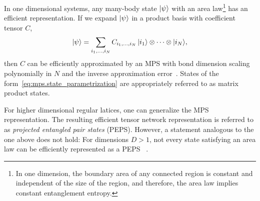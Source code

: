 In one dimensional systems, any many-body state $\ket{\psi}$ with an area law\footnote{%
  In one dimension, the boundary area of any connected region is constant and independent of the size of the region, and therefore, the area law implies constant entanglement entropy.
}
has an efficient representation.
If we expand $\ket{\psi}$ in a product basis with coefficient tensor $C$,
\[
  \ket\psi = \sum_{i_1,\ldots,i_N} C_{i_1,\ldots,i_N} \, \ket{i_1} \otimes \cdots \otimes \ket{i_N},
  \label{eq:mps.state_parametrization}
\]
then $C$ can be efficiently approximated by an MPS with bond dimension scaling polynomially in $N$ and the inverse approximation error~\cite{Hastings_2006_Solving,Verstraete_2006_Matrix,Eisert_2010_Colloquium,Arad_2013_Area,Arad_2016_Rigorous}.
States of the form~\eqref{eq:mps.state_parametrization} are appropriately referred to as matrix product states.

For higher dimensional regular latices, one can generalize the MPS representation.
The resulting efficient tensor network representation is referred to as \emph{projected entangled pair states} (PEPS).
However, a statement analogous to the one above does not hold:
For dimensions $D > 1$, not every state satisfying an area law can be efficiently represented as a PEPS~\cite{Ge_2016_Area}
.\\


